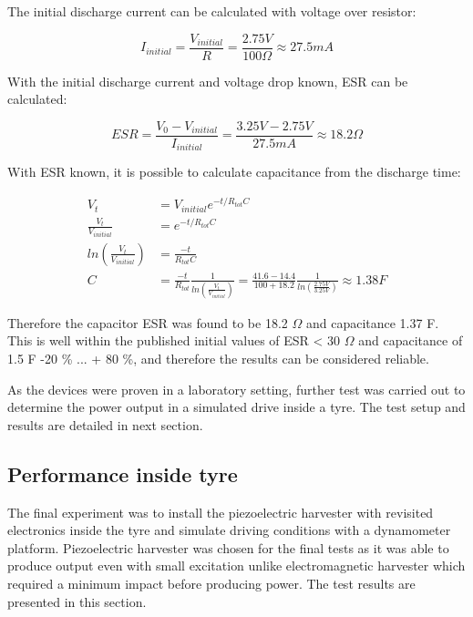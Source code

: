 The initial discharge current can be calculated with voltage over resistor:

\begin{equation}
  I_{initial} = \frac{V_{initial}}{R} = \frac{2.75 V}{100 \Omega} \approx 27.5 mA 
\end{equation}

With the initial discharge current and voltage drop known, ESR can be calculated:

\begin{equation}
  ESR = \frac{V_{0} - V_{initial}}{I_{initial}} = \frac{3.25 V - 2.75 V}{27.5 mA} \approx 18.2 \Omega
\end{equation}

With ESR known, it is possible to calculate capacitance from the discharge time:

\begin{equation}
\begin{split}
  V_t                            &= V_{initial}e^{-t/R_{tot}C} \\
  \frac{V_t}{V_{initial}}                &= e^{-t/R_{tot}C} \\
  ln\left(\frac{V_t}{V_{initial}}\right) &= \frac{-t}{R_{tot}C} \\
  C                              &= \frac{-t}{R_{tot}} \frac{1}{ ln\left(\frac{V_t}{V_{initial}}\right)} = \frac{41.6-14.4}{100 + 18.2} \frac{1}{ ln\left(\frac{2.75 V}{3.25 V}\right)} \approx 1.38 F
\end{split}
\end{equation}

Therefore the capacitor ESR was found to be 18.2 $\Omega$ and capacitance 1.37 F. This is well within the published \cite{panasonic_scap} initial values of ESR < 30 $\Omega$ and capacitance of 1.5 F -20 \% ... + 80 \%, and therefore the results can be considered reliable. 

As the devices were proven in a laboratory setting, further test was carried out to determine the power output in a simulated drive inside a tyre. The test setup and results are detailed in next section.

\subsection{Performance inside tyre}
The final experiment was to install the piezoelectric harvester with revisited electronics inside the tyre and simulate driving conditions with a dynamometer platform. Piezoelectric harvester was chosen for the final tests as it was able to produce output even with small excitation unlike electromagnetic harvester which required a minimum impact before producing power. The test results are presented in this section. 

